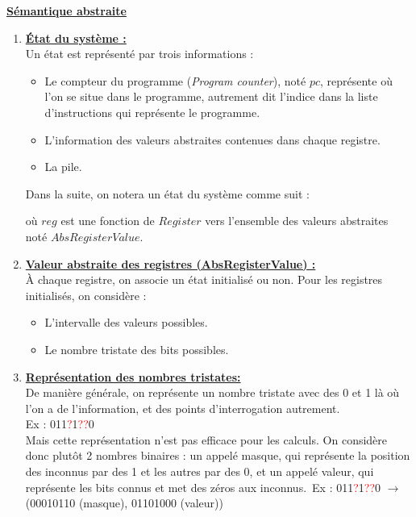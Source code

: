 \documentclass[a4paper,french, 12pt]{article}
\begin{document}
		\noindent\textbf{\underline{Sémantique abstraite}}\
		\begin{enumerate}
		\item \textbf{\underline{État du système :}}\\
		Un état est représenté par trois informations :
		\begin{itemize}
		\item Le compteur du programme (\textit{Program counter}), noté $pc$, représente où l'on se situe dans le programme, autrement dit l'indice dans la liste d'instructions qui représente le programme.
		\item L'information des valeurs abstraites contenues dans chaque registre.
		\item La pile.
		\end{itemize}
		Dans la suite, on notera un état du système comme suit :
		
		où $reg$ est une fonction de $Register$ vers l'ensemble des valeurs abstraites noté $AbsRegisterValue$.\\

		\item \textbf{\underline{Valeur abstraite des registres (AbsRegisterValue) :}}\\
		À chaque registre, on associe un état initialisé ou non. Pour les registres initialisés, on considère :
		\begin{itemize}
		\item L'intervalle des valeurs possibles.
		\item Le nombre tristate des bits possibles.\\
		\end{itemize}

		\item \textbf{\underline{Représentation des nombres tristates:}}\\
		De manière générale, on représente un nombre tristate avec des 0 et 1 là où l'on a de l'information, et des points d'interrogation autrement.\\
		Ex : 011\textcolor{red}{?}1\textcolor{red}{??}0\\
		Mais cette représentation n'est pas efficace pour les calculs. On considère donc plutôt 2 nombres binaires : un appelé masque, qui représente la position des inconnus par des 1 et les autres par des 0, et un appelé valeur, qui représente les bits connus et met des zéros aux inconnus.\
		Ex : 011\textcolor{red}{?}1\textcolor{red}{??}0 $\to$ (00010110 (masque), 01101000 (valeur))\\
	

\end{enumerate}
\end{document}
